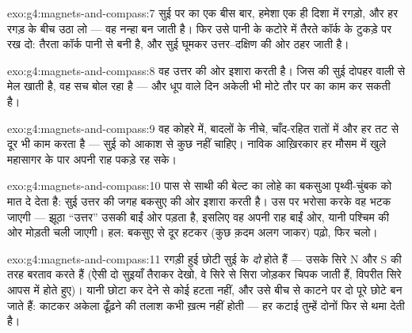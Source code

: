 \begin{solution}{exo:g4:magnets-and-compass:7}
सुई पर  का एक  बीस बार, हमेशा एक ही दिशा में रगड़ो, और हर
रगड़ के बीच  उठा लो --- वह नन्हा  बन जाती है। फिर उसे पानी
के कटोरे में तैरते कॉर्क के टुकड़े पर रख दो: तैरता कॉर्क पानी से बनी
 है, और सुई घूमकर उत्तर--दक्षिण की ओर ठहर जाती है।
\end{solution}

\begin{solution}{exo:g4:magnets-and-compass:8}
वह उत्तर की ओर इशारा करती है। जिस  की सुई दोपहर वाली  से
मेल खाती है, वह सच बोल रहा है --- और धूप वाले दिन अकेली  भी
मोटे तौर पर  का काम कर सकती है।
\end{solution}

\begin{solution}{exo:g4:magnets-and-compass:9}
वह कोहरे में, बादलों के नीचे, चाँद-रहित रातों में और हर तट से दूर भी
काम करता है --- सुई को आकाश से कुछ नहीं चाहिए। नाविक आख़िरकार हर
मौसम में खुले महासागर के पार अपनी राह पकड़े रह सके।
\end{solution}

\begin{solution}{exo:g4:magnets-and-compass:10}
पास से साथी की बेल्ट का लोहे का बकसुआ पृथ्वी-चुंबक को मात दे देता है:
सुई उत्तर की जगह बकसुए की ओर इशारा करती है। उस पर भरोसा करके वह भटक
जाएगी --- झूठा ``उत्तर'' उसकी बाईं ओर पड़ता है, इसलिए वह अपनी राह
बाईं ओर, यानी पश्चिम की ओर मोड़ती चली जाएगी। हल:  बकसुए से
दूर हटकर (कुछ क़दम अलग जाकर) पढ़ो, फिर चलो।
\end{solution}

\begin{solution}{exo:g4:magnets-and-compass:11}
रगड़ी हुई छोटी सुई के \emph{दो}  होते हैं --- उसके सिरे N और S
की तरह बरताव करते हैं (ऐसी दो सुइयाँ तैराकर देखो, वे सिरे से सिरा
जोड़कर चिपक जाती हैं, विपरीत सिरे आपस में  होते हुए)। यानी
 छोटा कर देने से कोई  हटता नहीं, और उसे बीच से काटने पर
दो पूरे छोटे  बन जाते हैं: काटकर अकेला  ढूँढ़ने की तलाश कभी
ख़त्म नहीं होती --- हर कटाई तुम्हें दोनों  फिर से थमा देती है।
\end{solution}
